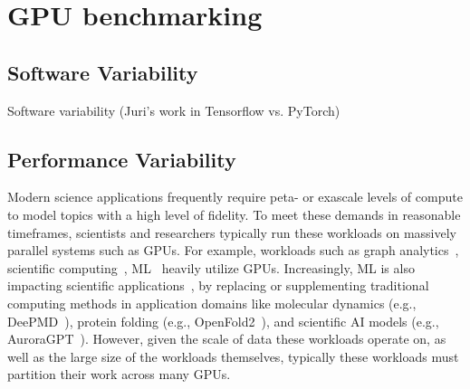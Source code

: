 \section{GPU benchmarking}
\label{sec:gpu}

\subsection{Software Variability}
\label{sec:gpu-swVar}

Software variability (Juri’s work in Tensorflow vs. PyTorch)

\subsection{Performance Variability}
\label{sec:gpu-var}


Modern science applications frequently require peta- or exascale levels of compute to model topics with a high level of fidelity.
To meet these demands in reasonable timeframes, scientists and researchers typically run these workloads on massively parallel systems such as GPUs.
For example, workloads such as graph analytics~\cite{CheBeckmann2013, WangPan2017-gunrock}, scientific computing~\cite{coral2, olcf6-bmks, kim2018qmcpack, WuTaylor2019-candle}, ML~\cite{BanburyReddi2021-tinyMLPerf, BaruahShivdikar2021-gnnMark, DongKaeli2017-dnnmark, Narang2017-deepBench, MattsonCheng2019-mlperfTrain, MattsonReddi2020-mlPerf, Reddi2020mlperf-Infer, ReddiCheng2021-mlPerfVision} heavily utilize GPUs.
Increasingly, ML is also impacting scientific applications~\cite{fan2021predicting, jumper2021highly, kates2019predicting, ThiyagalingamShankar2022-mlSci, ThiyagalingamVonLaszewski2022-aiForSciMLCommons}, by replacing or supplementing traditional computing methods in application domains like molecular dynamics (e.g., DeePMD~\cite{WangZhang2018-deepmd, ZengZhang2023-deepmd2}), protein folding (e.g., OpenFold2~\cite{openfold2}), and scientific AI models (e.g., AuroraGPT~\cite{Stevens2023-auroraGPT}).
However, given the scale of data these workloads operate on, as well as the large size of the workloads themselves, typically these workloads must partition their work across many GPUs.

